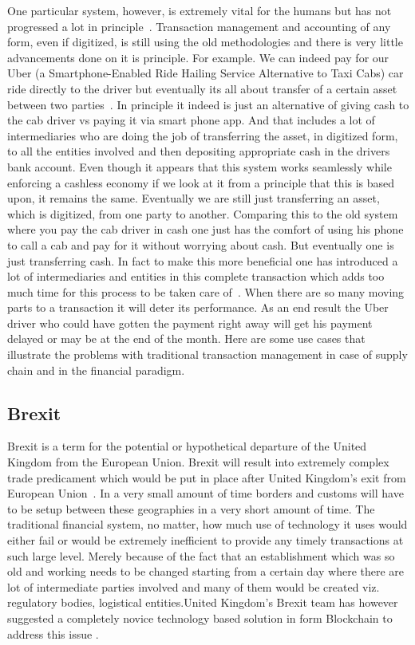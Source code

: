One particular system, however, is extremely vital for the humans but
has not progressed a lot in principle~\cite{lionelshriver2}.
Transaction management and accounting of any form, even if digitized,
is still using the old methodologies and there is very little
advancements done on it is principle. For example. We can indeed pay
for our Uber (a Smartphone-Enabled Ride Hailing
  Service Alternative to Taxi Cabs) car ride directly to the driver
but eventually its all about transfer of a certain asset between two
parties~\cite{uber3}. In principle it indeed is just an alternative of
giving cash to the cab driver vs paying it via smart phone app. And
that includes a lot of intermediaries who are doing the job of
transferring the asset, in digitized form, to all the entities
involved and then depositing appropriate cash in the drivers bank
account. Even though it appears that this system works seamlessly
while enforcing a cashless economy if we look at it from a principle
that this is based upon, it remains the same. Eventually we are still
just transferring an asset, which is digitized, from one party to
another. Comparing this to the old system where you pay the cab driver
in cash one just has the comfort of using his phone to call a cab and
pay for it without worrying about cash. But eventually one is just
transferring cash. In fact to make this more beneficial one has
introduced a lot of intermediaries and entities in this complete
transaction which adds too much time for this process to be taken care
of~\cite{tapscott1}. When there are so many moving parts to a
transaction it will deter its performance. As an end result the Uber
driver who could have gotten the payment right away will get his payment
delayed or may be at the end of the month. Here are some use cases
that illustrate the problems with traditional transaction management
in case of supply chain and in the financial paradigm.

\subsection{Brexit}

Brexit is a term for the potential or hypothetical departure of
  the United Kingdom from the European Union. Brexit will result into
extremely complex trade predicament which would be put in place after
United Kingdom's exit from European Union~\cite{nicolasbotton4}. In a
very small amount of time borders and customs will have to be setup
between these geographies in a very short amount of time. The
traditional financial system, no matter, how much use of technology it
uses would either fail or would be extremely inefficient to provide
any timely transactions at such large level. Merely because of the
fact that an establishment which was so old and working needs to be
changed starting from a certain day where there are lot of
intermediate parties involved and many of them would be created viz.
regulatory bodies, logistical entities.United Kingdom's Brexit
team has however suggested a completely novice technology based
solution in form Blockchain to address this issue
\cite{nicolasbotton4}.


